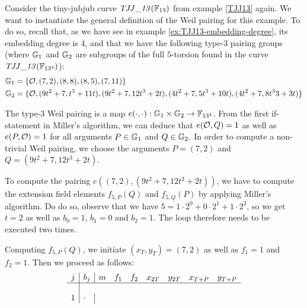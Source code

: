 \begin{example} Consider the tiny-jubjub curve $\mathit{TJJ\_13}(\mathbb{F}_{13})$ from example \ref{TJJ13} again. We want to instantiate the general definition of the Weil pairing for this example. To do so, recall that, as we have see in example \ref{ex:TJJ13-embedding-degree}, its embedding degree is $4$, and that we have the following type-3 pairing groups (where $\mathbb{G}_1$ and $\mathbb{G}_2$ are subgroups of the full $5$-torsion found in the curve $\mathit{TJJ\_13}(\mathbb{F}_{13^4})$):
\begin{align*}
\mathbb{G}_1 & = \{\mathcal{O}, (7,2), (8,8), (8,5), (7,11)\}\\
\mathbb{G}_2 & = \{\mathcal{O}, (9t^2 + 7,t^3 + 11t), (9t^2 + 7, 12t^3 + 2t), 
(4t^2 + 7, 5t^3 + 10t), (4t^2 + 7, 8t^33 + 3t)\}
\end{align*}

The type-3 Weil pairing is a map $e(\cdot,\cdot): \mathbb{G}_1 \times \mathbb{G}_2 \to \mathbb{F}_{13^4}$. From the first if-statement in Miller's algorithm, we can deduce that 
$e(\mathcal{O},Q)=1$ as well as $e(P,\mathcal{O})=1$ for all arguments $P\in\mathbb{G}_1$ and $Q\in \mathbb{G}_2$. In order to compute a non-trivial Weil pairing, we choose the arguments 
$P=(7,2)$ and $Q=(9t^2 + 7, 12t^3 + 2t)$. 

To compute the pairing $e((7,2),(9t^2 + 7, 12t^3 + 2t))$, we have to compute the extension field elements $f_{5,P}(Q)$ and $f_{5,Q}(P)$ by applying Miller's algorithm. Do do so, observe that we have $5 = 1\cdot 2^0 + 0 \cdot 2^1 + 1\cdot 2^2$, so we get $t=2$ as well as $b_0=1$, $b_1=0$ and $b_2=1$. The loop therefore needs to be executed two times. 

Computing $f_{5,P}(Q)$, we initiate $(x_T,y_T) = (7,2)$ as well as $f_1=1$ and $f_2=1$. Then we proceed as follows:
$$
\begin{array}{l|l|lllllll}
j & b_j & m & f_1 & f_2 & x_{2T} & y_{2T} & x_{T+P} & y_{T+P}\\
\hline\\
1 & \cdot & 
\end{array}
$$


\end{example}

